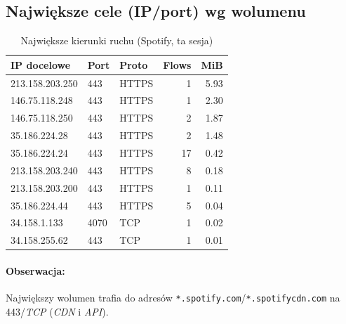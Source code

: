 \subsection{Największe cele (IP/port) wg wolumenu}
\begin{table}[H]
  \centering
  \caption{Największe kierunki ruchu (Spotify, ta sesja)}
  \label{tab:spotify-topdst}
  \begin{tabular}{lllrr}
    \toprule
    \textbf{IP docelowe} & \textbf{Port} & \textbf{Proto} & \textbf{Flows} & \textbf{MiB} \\
    \midrule
    213.158.203.250 & 443  & HTTPS & 1  & 5.93 \\
    146.75.118.248  & 443  & HTTPS & 1  & 2.30 \\
    146.75.118.250  & 443  & HTTPS & 2  & 1.87 \\
    35.186.224.28   & 443  & HTTPS & 2  & 1.48 \\
    35.186.224.24   & 443  & HTTPS & 17 & 0.42 \\
    213.158.203.240 & 443  & HTTPS & 8  & 0.18 \\
    213.158.203.200 & 443  & HTTPS & 1  & 0.11 \\
    35.186.224.44   & 443  & HTTPS & 5  & 0.04 \\
    34.158.1.133    & 4070 & TCP   & 1  & 0.02 \\
    34.158.255.62   & 443  & TCP   & 1  & 0.01 \\
    \bottomrule
  \end{tabular}
\end{table}

\paragraph{Obserwacja:}
Największy wolumen trafia do adresów \texttt{*.spotify.com}/\texttt{*.spotifycdn.com} na 443/\emph{TCP} (\emph{CDN} i \emph{API}).

